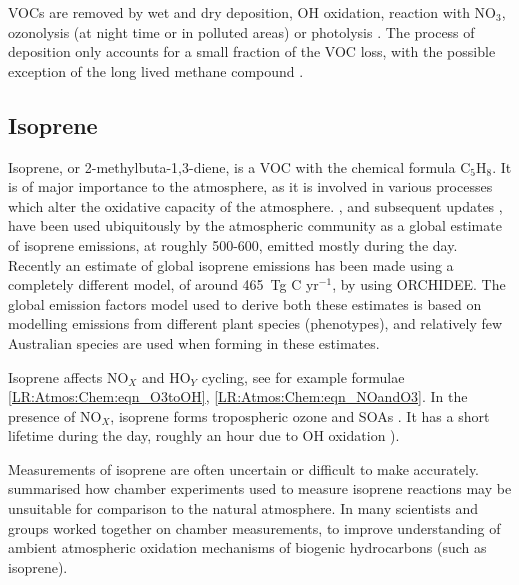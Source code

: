     VOCs are removed by wet and dry deposition, OH oxidation, reaction with NO$_3$, ozonolysis (at night time or in polluted areas) or photolysis \citep{AtkinsonArey2003, Brown2009}.
    The process of deposition only accounts for a small fraction of the VOC loss, with the possible exception of the long lived methane compound \citep{AtkinsonArey2003}.
    
    
  
  \subsection{Isoprene}
  \label{LR:VOCs:Isop}
    Isoprene, or 2-methylbuta-1,3-diene, is a VOC with the chemical formula C$_5$H$_8$. 
    It is of major importance to the atmosphere, as it is involved in various processes which alter the oxidative capacity of the atmosphere.
    \cite{Guenther1995}, and subsequent updates \citep{Guenther2000,Guenther2006,Guenther2012}, have been used ubiquitously by the atmospheric community as a global estimate of isoprene emissions, at roughly 500-600\tgpyr, emitted mostly during the day.
    Recently an estimate of global isoprene emissions has been made using a completely different model, of around 465~Tg C yr$^{-1}$, by \cite{Messina2016} using ORCHIDEE.
    The global emission factors model used to derive both these estimates is based on modelling emissions from different plant species (phenotypes), and relatively few Australian species are used when forming in these estimates.
    
    Isoprene affects NO$_X$ and HO$_Y$ cycling, see for example formulae \ref{LR:Atmos:Chem:eqn_O3toOH}, \ref{LR:Atmos:Chem:eqn_NOandO3}.
    In the presence of NO$_X$, isoprene forms tropospheric ozone and SOAs \citep{Wagner2002, Millet2006}.
    It has a short lifetime during the day, roughly an hour due to OH oxidation \citep{AtkinsonArey2003}).
    
    
    Measurements of isoprene are often uncertain or difficult to make accurately.
    \cite{Kanakidou2005} summarised how chamber experiments used to measure isoprene reactions may be unsuitable for comparison to the natural atmosphere.
    In \cite{Nguyen2014} many scientists and groups worked together on chamber measurements, to improve understanding of ambient atmospheric oxidation mechanisms of biogenic hydrocarbons (such as isoprene).
    
